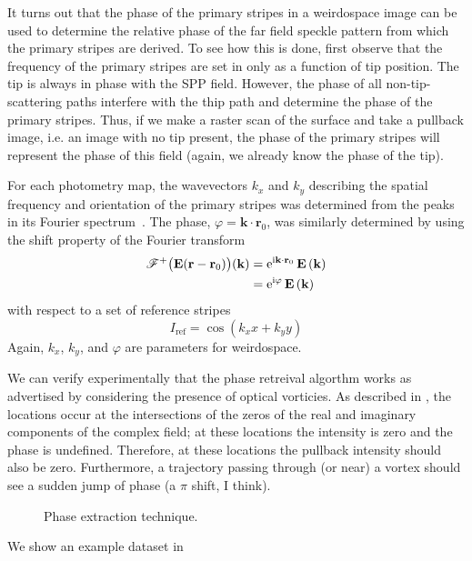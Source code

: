 It turns out that the phase of the primary stripes in a weirdospace image
can be used to determine the relative phase of the far field speckle
pattern from which the primary stripes are derived.  To see how this is
done, first observe that the frequency of the primary stripes are set in
 only as a function of tip position.  The tip
is always in phase with the SPP field.  However, the phase of all
non-tip-scattering paths interfere with the thip path and determine the
phase of the primary stripes.  Thus, if we make a raster scan of the
surface and take a pullback image, i.e. an image with no tip present, the
phase of the primary stripes will represent the phase of this field (again,
we already know the phase of the tip).

For each photometry map, the wavevectors $k_x$ and $k_y$ describing the
spatial frequency and orientation of the primary stripes was determined
from the peaks in its Fourier spectrum~\cite{huntley1989speckle}.  The
phase, $\varphi=\mathbf{k}\cdot\mathbf{r}_0$, was similarly determined
by using the shift property of the Fourier transform
\begin{align}
{\mathscr{F}^{+}\bigl(\mathbf{E}(\mathbf{r}-\mathbf{r}_0)\bigr)}(\mathbf{k}) &= 
{\mathrm{e}}^{{\mathrm{i}} \mathbf{k}\cdot \mathbf{r}_0}\,
\mathbf{E}\left(\mathbf{k}\right)\\
&= {\mathrm{e}}^{{\mathrm{i}} \varphi}\, \mathbf{E}\left(\mathbf{k}\right)
\end{align}
with respect to a set of reference stripes
\begin{equation}
I_\mathrm{ref} = \cos(k_x x + k_y y)
\end{equation}
Again, $k_x$, $k_y$, and $\varphi$ are parameters for weirdospace.

We can verify experimentally that the phase retreival algorthm works as
advertised by considering the presence of optical vorticies.  As described
in , the locations occur at the intersections of the zeros
of the real and imaginary components of the complex field; at these
locations the intensity is zero and the phase is undefined.  Therefore, at
these locations the pullback intensity should also be zero.  Furthermore, a
trajectory passing through (or near) a vortex should see a sudden jump of
phase (a $\pi$ shift, I think).

\begin{figure}
\centering
\caption{Phase extraction technique.}
\label{fig:phaseextractiontechnique}
\end{figure}

We show an example dataset in 
